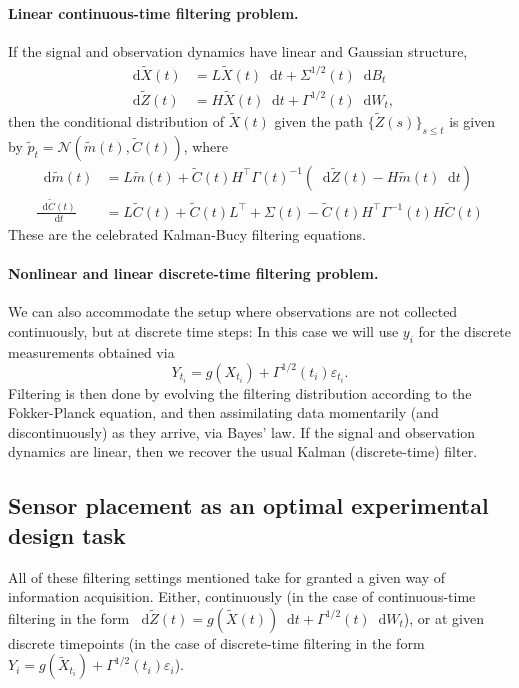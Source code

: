 \documentclass[10pt]{article}
\numberwithin{equation}{section}
\numberwithin{figure}{section}
\theoremstyle{remark}
\newcommand{\cN}{\mathcal N}
\newcommand{\dd }{\mathop{}\!\mathrm{d}}
\newcommand{\eps}{\varepsilon}
\begin{document}
\paragraph{Linear continuous-time filtering problem.}
If the signal and observation dynamics have linear and Gaussian structure,
\begin{equation}\label{eq:linear_Gauss_unweighted}
\begin{split}
    \dd \tilde X(t) &= L \tilde X(t)\dd t + \Sigma^{1/2}(t)\dd B_t\\
    \dd \tilde Z(t) &= H \tilde X(t)\dd t + \Gamma^{1/2}(t)\dd W_t,
\end{split}
\end{equation}
then the conditional distribution of $\tilde X(t)$ given the path $\{\tilde Z(s)\}_{s\leq t}$ is given by $\tilde p_t = \cN(\tilde m(t), \tilde C(t))$, where
\begin{equation}\label{eq:Kalman_Bucy}
\begin{split}
    \dd \tilde m(t) &= L \tilde m(t) + \tilde C(t) H^\top\Gamma(t)^{-1}\left(\dd \tilde Z(t)-H\tilde m(t)\dd t\right)\\
    \frac{\dd \tilde C(t)}{\dd t} &=L \tilde C(t) + \tilde C(t) L^\top + \Sigma(t) - \tilde C(t) H^\top \Gamma^{-1}(t) H \tilde C(t)
\end{split}
\end{equation}
These are the celebrated Kalman-Bucy filtering equations. 

\paragraph{Nonlinear and linear discrete-time filtering problem.}
We can also accommodate the setup where observations are not collected continuously, but at discrete time steps: In this case we will use $y_i$ for the discrete measurements obtained via
\begin{equation}\label{eq:filtering_disc}
    Y_{t_i} = g(X_{t_i}) +  \Gamma^{1/2}(t_i)\eps_{t_i}.
\end{equation}
Filtering is then done by evolving the filtering distribution according to the Fokker-Planck equation, and then assimilating data momentarily (and discontinuously) as they arrive, via Bayes' law. If the signal and observation dynamics are linear, then we recover the usual Kalman (discrete-time) filter.

\subsection{Sensor placement as an optimal experimental design task}
All of these filtering settings mentioned take for granted a given way of information acquisition. Either, continuously (in the case of continuous-time filtering in the form $\dd \tilde Z(t) = g(\tilde X(t))\dd t + \Gamma^{1/2}(t)\dd W_t$), or at given discrete timepoints (in the case of discrete-time filtering in the form $Y_{i} = g(\tilde X_{t_i}) + \Gamma^{1/2}(t_i)\eps_i$).
\end{document}
